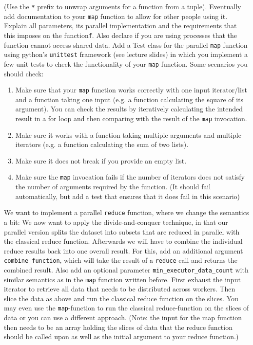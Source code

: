 \documentclass[]{erlangen-problemset}
\begin{document}
\begin{problem}[title={Parallel operators}]
(Use the \texttt{*} prefix to unwrap arguments for a function from a tuple).
Eventually add documentation to your \texttt{map} function to allow for other people using it.
Explain all parameters, its parallel implementation and the requirements that this imposes on the function\texttt{f}.
Also declare if you are using processes that the function cannot access shared data.
\Question Add a Test class for the parallel \texttt{map} function using python's \texttt{unittest} framework (see lecture slides) in which you implement a few unit tests to check the functionality of your \texttt{map} function. 
Some scenarios you should check:
\begin{enumerate}
    \item Make sure that your \texttt{map} function works correctly with one input iterator/list and a function taking one input (e.g. a function calculating the square of its argument). You can check the results by iteratively calculating the intended result in a for loop and then comparing with the result of the \texttt{map} invocation.
    \item Make sure it works with a function taking multiple arguments and multiple iterators (e.g. a function calculating the sum of two lists).
    \item Make sure it does not break if you provide an empty list.
    \item Make sure the \texttt{map} invocation fails if the number of iterators does not satisfy the number of arguments required by the function. (It should fail automatically, but add a test that ensures that it does fail in this scenario)
\end{enumerate}
\Question We want to implement a parallel \texttt{reduce} function, where we change the semantics a bit:
We now want to apply the divide-and-conquer technique, in that our parallel version splits the dataset into subsets that are reduced in parallel with the classical reduce function.
Afterwards we will have to combine the individual reduce results back into one overall result.
For this, add an additional argument \texttt{combine\_function}, which will take the result of a \texttt{reduce} call and returns the combined result.
Also add an optional parameter \texttt{min\_executor\_data\_count} with similar semantics as in the \texttt{map} function written before.
First exhaust the input iterator to retrieve all data that needs to be distributed across workers.
Then slice the data as above and run the classical reduce function on the slices.
You may even use the \texttt{map}-function to run the classical reduce-function on the slices of data or you can use a different approach. (Note: the input for the map function then needs to be an array holding the slices of data that the reduce function should be called upon as well as the initial argument to your reduce function.)

\end{problem}
\end{document}
